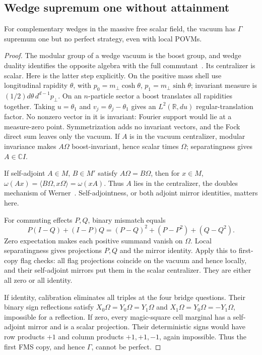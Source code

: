 \subsection{Wedge supremum one without attainment}
\begin{theorem}\label{thm:wedge}
For complementary wedges in the massive free scalar field, the vacuum has $\Gamma$ supremum one but no perfect strategy, even with local POVMs.
\end{theorem}
\begin{proof}
The modular group of a wedge vacuum is the boost group, and wedge duality identifies the opposite algebra with the full commutant~\cite[Theorem 4]{BW75}. Its centralizer is scalar. Here is the latter step explicitly. On the positive mass shell use longitudinal rapidity $\theta$, with $p_0=m_\perp\cosh\theta$, $p_1=m_\perp\sinh\theta$; invariant measure is $(1/2)d\theta\,d^{d-1}p_\perp$. On an $n$-particle sector a boost translates all rapidities together. Taking $u=\theta_1$ and $v_j=\theta_j-\theta_1$ gives an $L^2(\mathbb R,du)$ regular-translation factor. No nonzero vector in it is invariant: Fourier support would lie at a measure-zero point. Symmetrization adds no invariant vectors, and the Fock direct sum leaves only the vacuum. If $A$ is in the vacuum centralizer, modular invariance makes $A\Omega$ boost-invariant, hence scalar times $\Omega$; separatingness gives $A\in\mathbb CI$.

If self-adjoint $A\in M$, $B\in M'$ satisfy $A\Omega=B\Omega$, then for $x\in M$,
$\omega(Ax)=\langle B\Omega,x\Omega\rangle=\omega(xA)$. Thus $A$ lies in the centralizer, the doubles mechanism of Werner~\cite[Section II]{WernerDoubles}. Self-adjointness, or both adjoint mirror identities, matters here.

For commuting effects $P,Q$, binary mismatch equals
\[
 P(I-Q)+(I-P)Q=(P-Q)^2+(P-P^2)+(Q-Q^2).
\]
Zero expectation makes each positive summand vanish on $\Omega$. Local separatingness gives projections $P,Q$ and the mirror identity. Apply this to first-copy flag checks: all flag projections coincide on the vacuum and hence locally, and their self-adjoint mirrors put them in the scalar centralizer. They are either all zero or all identity.

If identity, calibration eliminates all triples at the four bridge questions. Their binary sign reflections satisfy $X_0\Omega=Y_0\Omega=Y_1\Omega$ and $X_1\Omega=Y_0\Omega=-Y_1\Omega$, impossible for a reflection. If zero, every magic-square cell marginal has a self-adjoint mirror and is a scalar projection. Their deterministic signs would have row products $+1$ and column products $+1,+1,-1$, again impossible. Thus the first FMS copy, and hence $\Gamma$, cannot be perfect.


\end{proof}
